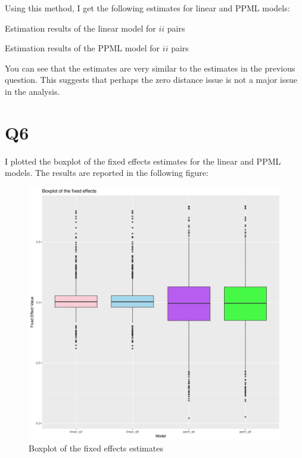 \documentclass[
  11pt]{article}
\begin{document}
Using this method, I get the following estimates for linear and PPML
models:

\begin{table}[!ht]
\centering
\caption{Estimation results of the linear model for $ii$ pairs}
\label{tab:est_linear_ii_2}

\end{table}

\begin{table}[!ht]
\centering
\caption{Estimation results of the PPML model for $ii$ pairs}
\label{tab:est_ppml_ii_2}

\end{table}

You can see that the estimates are very similar to the estimates in the
previous question. This suggests that perhaps the zero distance issue is
not a major issue in the analysis.

\section*{Q6}\label{q6}

I plotted the boxplot of the fixed effects estimates for the linear and
PPML models. The results are reported in the following figure:

\begin{figure}[H]

{\centering \includegraphics[width=0.7\linewidth,height=\textheight,keepaspectratio]{figures/histogram_fixef.png}

}

\caption{Boxplot of the fixed effects estimates}

\end{figure}%
\end{document}

